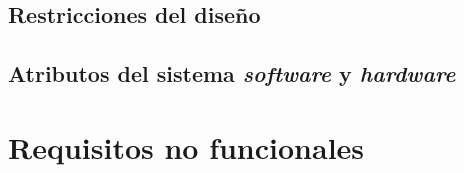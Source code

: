 \subsection{Restricciones del diseño}


\subsection{Atributos del sistema \textit{software} y \textit{hardware}}


\section{Requisitos no funcionales}


% 
